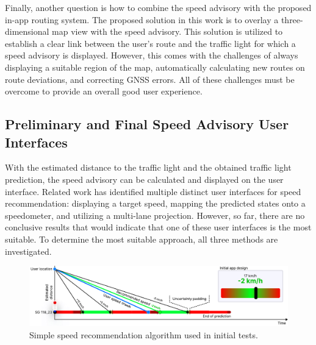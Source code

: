 Finally, another question is how to combine the speed advisory with the proposed in-app routing system. The proposed solution in this work is to overlay a three-dimensional map view with the speed advisory. This solution is utilized to establish a clear link between the user's route and the traffic light for which a speed advisory is displayed. However, this comes with the challenges of always displaying a suitable region of the map, automatically calculating new routes on route deviations, and correcting GNSS errors. All of these challenges must be overcome to provide an overall good user experience.

\subsection{Preliminary and Final Speed Advisory User Interfaces}

With the estimated distance to the traffic light and the obtained traffic light prediction, the speed advisory can be calculated and displayed on the user interface. Related work has identified multiple distinct user interfaces for speed recommendation: displaying a target speed, mapping the predicted states onto a speedometer, and utilizing a multi-lane projection. However, so far, there are no conclusive results that would indicate that one of these user interfaces is the most suitable. To determine the most suitable approach, all three methods are investigated.

\begin{figure}[htbp]
\centering
\includegraphics[width=\linewidth]{images/graph-based-speed-recommendation.pdf}
\caption{Simple speed recommendation algorithm used in initial tests.}
\label{fig:graph-based-speed-recommendation}
\end{figure}

